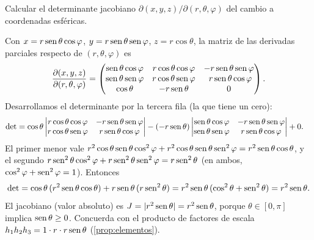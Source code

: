 \begin{ejercicio}\label{ejer:jacobiano}
Calcular el determinante jacobiano $\partial(x,y,z)/\partial(r,\theta,\varphi)$ del
cambio a coordenadas esféricas.
\end{ejercicio}
\begin{resolucion}
Con $x=r\operatorname{sen}\theta\cos\varphi$, $y=r\operatorname{sen}\theta\operatorname{sen}\varphi$, $z=r\cos\theta$, la
matriz de las derivadas parciales respecto de $(r,\theta,\varphi)$ es
\[
  \frac{\partial(x,y,z)}{\partial(r,\theta,\varphi)}=
  \begin{pmatrix}
    \sen\theta\cos\varphi & r\cos\theta\cos\varphi & -r\sen\theta\sen\varphi\\
    \sen\theta\sen\varphi & r\cos\theta\sen\varphi & \ r\sen\theta\cos\varphi\\
    \cos\theta & -r\sen\theta & 0
  \end{pmatrix}.
\]
Desarrollamos el determinante por la tercera fila (la que tiene un cero):
\begin{align*}
  \det&=\cos\theta\begin{vmatrix}r\cos\theta\cos\varphi & -r\operatorname{sen}\theta\operatorname{sen}\varphi\\ r\cos\theta\operatorname{sen}\varphi & r\operatorname{sen}\theta\cos\varphi\end{vmatrix}
  -(-r\operatorname{sen}\theta)\begin{vmatrix}\operatorname{sen}\theta\cos\varphi & -r\operatorname{sen}\theta\operatorname{sen}\varphi\\ \operatorname{sen}\theta\operatorname{sen}\varphi & r\operatorname{sen}\theta\cos\varphi\end{vmatrix}+0.
\end{align*}
El primer menor vale
$r^{2}\cos\theta\operatorname{sen}\theta\cos^{2}\varphi+r^{2}\cos\theta\operatorname{sen}\theta\operatorname{sen}^{2}\varphi=r^{2}\operatorname{sen}\theta\cos\theta$,
y el segundo
$r\operatorname{sen}^{2}\theta\cos^{2}\varphi+r\operatorname{sen}^{2}\theta\operatorname{sen}^{2}\varphi=r\operatorname{sen}^{2}\theta$
(en ambos, $\cos^{2}\varphi+\operatorname{sen}^{2}\varphi=1$). Entonces
\[
  \det=\cos\theta\,(r^{2}\operatorname{sen}\theta\cos\theta)+r\operatorname{sen}\theta\,(r\operatorname{sen}^{2}\theta)
  =r^{2}\operatorname{sen}\theta\,(\cos^{2}\theta+\operatorname{sen}^{2}\theta)=r^{2}\operatorname{sen}\theta .
\]
El jacobiano (valor absoluto) es $J=|r^{2}\operatorname{sen}\theta|=r^{2}\operatorname{sen}\theta$, porque
$\theta\in[0,\pi]$ implica $\operatorname{sen}\theta\ge0$. Concuerda con el producto de
factores de escala $h_1h_2h_3=1\cdot r\cdot r\operatorname{sen}\theta$ (\cref{prop:elementos}).
\end{resolucion}

